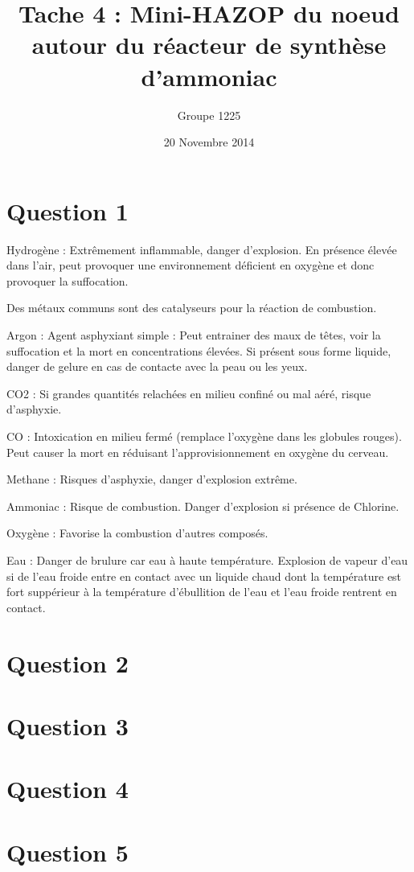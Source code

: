 \documentclass[a4paper,oneside,12pt]{article}
\author{Groupe 1225}
\date{20 Novembre 2014}
\title{Tache 4 : Mini-HAZOP du noeud autour du réacteur de synthèse d'ammoniac}
\begin{document}
\maketitle

\section*{Question 1}

Hydrogène : Extrêmement inflammable, danger d'explosion. En présence élevée dans l'air, peut provoquer une environnement déficient en oxygène et donc provoquer la suffocation. 

Des métaux communs sont des catalyseurs pour la réaction de combustion.

Argon : Agent asphyxiant simple : Peut entrainer des maux de têtes, voir la suffocation et la mort en concentrations élevées. Si présent sous forme liquide, danger de gelure en cas de contacte avec la peau ou les yeux.

CO2 : Si grandes quantités relachées en milieu confiné ou mal aéré, risque d'asphyxie.

CO : Intoxication en milieu fermé (remplace l'oxygène dans les globules rouges). Peut causer la mort en réduisant l'approvisionnement en oxygène du cerveau.

Methane : Risques d'asphyxie, danger d'explosion extrême.

Ammoniac : Risque de combustion. Danger d'explosion si présence de Chlorine.

Oxygène : Favorise la combustion d'autres composés.

Eau : Danger de brulure car eau à haute température. Explosion de vapeur d'eau si de l'eau froide entre en contact avec un liquide chaud dont la température est fort suppérieur à la température d'ébullition de l'eau et l'eau froide rentrent en contact.

\section*{Question 2}

\section*{Question 3}

\section*{Question 4}

\section*{Question 5}
\end{document}
